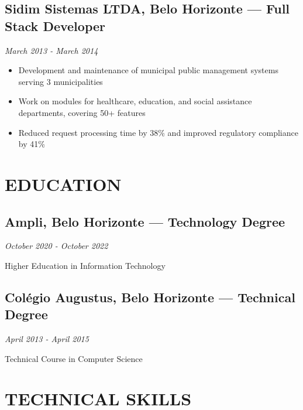 \documentclass[11pt,a4paper]{article}
\newcommand{\experiencia}[4]{
    \subsection{#1, #2 — #3}
    \textit{#4}
    \vspace{4pt}
}
\newcommand{\formacao}[4]{
    \subsection{#1, #2 — #3}
    \textit{#4}
    \vspace{4pt}
}
\begin{document}
\vspace{8pt}

\experiencia{Sidim Sistemas LTDA}{Belo Horizonte}{Full Stack Developer}{March 2013 - March 2014}
\begin{itemize}[leftmargin=20pt, topsep=0pt, itemsep=2pt]
    \item Development and maintenance of municipal public management systems serving 3 municipalities
    \item Work on modules for healthcare, education, and social assistance departments, covering 50+ features
    \item Reduced request processing time by 38\% and improved regulatory compliance by 41\%
\end{itemize}

\vspace{15pt}

\section{EDUCATION}

\formacao{Ampli}{Belo Horizonte}{Technology Degree}{October 2020 - October 2022}
Higher Education in Information Technology

\vspace{8pt}

\formacao{Colégio Augustus}{Belo Horizonte}{Technical Degree}{April 2013 - April 2015}
Technical Course in Computer Science

\vspace{15pt}

\section{TECHNICAL SKILLS}
\end{document}
